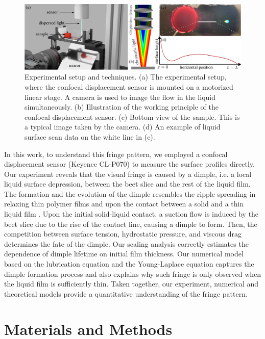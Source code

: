\documentclass[aps,prfluids,amsmath,amssymb,superscriptaddress,longbibliography]{revtex4-2}
\newif\ifhighlight
\newcommand{\hl}[1]{\ifhighlight\textcolor{blue}{#1}\else#1\fi}
\begin{document}
\begin{figure}
    \centering
    \includegraphics[width=.8\linewidth]{thin_film_setup.pdf}
    \caption{
    Experimental setup and techniques.
    (a) The experimental setup, where the confocal displacement sensor is mounted on a motorized linear stage. A camera is used to image the flow in the liquid simultaneously.
    (b) Illustration of the working principle of the confocal displacement sensor.
    (c) Bottom view of the sample. This is a typical image taken by the camera. 
    (d) An example of liquid surface scan data on the white line in (c). 
    }
    \label{fig:thin-film-setup}
\end{figure}

In this work, to understand this fringe pattern, we employed a confocal displacement sensor (Keyence CL-P070) to measure the surface profiles directly.
Our experiment reveals that the visual fringe is caused by a dimple, i.e. a local liquid surface depression, between the beet slice and the rest of the liquid film. 
\hl{The formation and the evolution of the dimple resembles the ripple spreading in relaxing thin polymer films \cite{Cormier2012,McGraw2012,Jalaal2019} and upon the contact between a solid and a thin liquid film \cite{Garcia-Gonzalez2023}.}
Upon the initial solid-liquid contact, a suction flow is induced by the beet slice due to the rise of the contact line, causing a dimple to form. 
Then, the competition between surface tension, hydrostatic pressure, and viscous drag determines the fate of the dimple.
\hl{Our scaling analysis correctly estimates the dependence of dimple lifetime on initial film thickness.}
Our numerical model based on the lubrication equation and the Young-Laplace equation captures the dimple formation process and also explains why such fringe is only observed when the liquid film is sufficiently thin.
Taken together, our experiment, numerical and theoretical models provide a quantitative understanding of the fringe pattern.

\section{Materials and Methods}
\end{document}
